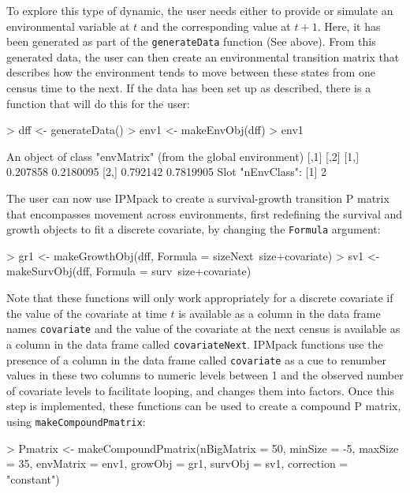 \documentclass{article}
\begin{document}
To explore this type of dynamic, the user needs  either to provide or simulate
an environmental variable at $t$ and the corresponding value at $t+1$. Here, it
has been generated as part of the {\tt generateData} function (See above). From
this generated data, the user can then create an environmental transition matrix
that describes how the environment tends to move between these states from one
census time to the next. If the data has been set up as described, there is a function that will do this for the user:
\begin{Schunk}
\begin{Sinput}
> dff <- generateData()
> env1 <- makeEnvObj(dff) 
> env1
\end{Sinput}
\begin{Soutput}
An object of class "envMatrix" (from the global environment)
         [,1]      [,2]
[1,] 0.207858 0.2180095
[2,] 0.792142 0.7819905
Slot "nEnvClass":
[1] 2
\end{Soutput}
\end{Schunk}
The user can now use IPMpack to create a survival-growth transition P matrix that encompasses movement across environments, first redefining the survival and growth
objects to fit a discrete covariate, by changing the {\tt Formula} argument: 
\begin{Schunk}
\begin{Sinput}
> gr1 <- makeGrowthObj(dff, Formula = sizeNext~size+covariate)
> sv1 <- makeSurvObj(dff, Formula = surv~size+covariate)
\end{Sinput}
\end{Schunk}
Note that these functions will only work appropriately for a discrete
covariate if the value of the covariate at time $t$ is available as a
column in the data frame names {\tt covariate} and the value of the
covariate at the next census is available as a column in the data
frame called {\tt covariateNext}. IPMpack functions use the presence
of a column in the data frame called {\tt covariate} as a cue to
renumber values in these two columns to numeric levels between 1 and
the observed number of covariate levels to facilitate looping, and
changes them into factors. Once this step is implemented, these
functions can be used to create a compound P matrix, using {\tt makeCompoundPmatrix}: 
\begin{Schunk}
\begin{Sinput}
> Pmatrix <- makeCompoundPmatrix(nBigMatrix = 50, minSize = -5, 
                                   maxSize = 35, 
                                   envMatrix = env1, growObj = gr1, 
                                   survObj = sv1, 
                                   correction = "constant")
\end{Sinput}
\end{Schunk}
\end{document}
